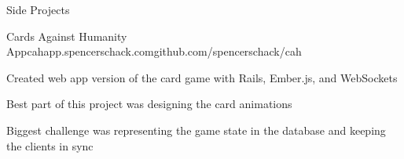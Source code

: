 \documentclass{resume} %
\begin{document}
\begin{rSection}{Side Projects}

\begin{rSubsection}{Cards Against Humanity App}{cahapp.spencerschack.com}{github.com/spencerschack/cah}{}{}
\item Created web app version of the card game with Rails, Ember.js, and WebSockets
\item Best part of this project was designing the card animations
\item Biggest challenge was representing the game state in the database and keeping the clients in sync
\end{rSubsection}

\end{rSection}
\end{document}
